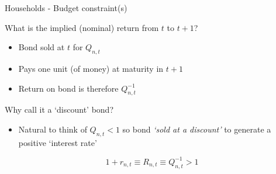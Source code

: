 \begin{frame}{Households - Budget constraint(s)}

What is the implied (nominal) return from $t$ to $t+1$?
\begin{itemize}
\item	Bond sold at $t$ for $Q_{n,t}$
\item	Pays one unit (of money) at maturity in $t+1$
\item	Return on bond is therefore $Q_{n,t}^{-1}$
\end{itemize}

\vspace{2mm}
Why call it a `discount' bond?
\begin{itemize}
\item	Natural to think of $Q_{n,t}<1$ so bond \emph{`sold at a discount'} to generate a positive `interest rate'
\end{itemize}
\[
1+r_{n,t} \equiv R_{n,t}\equiv Q_{n,t}^{-1}>1
\]


\end{frame}



%
%
%

